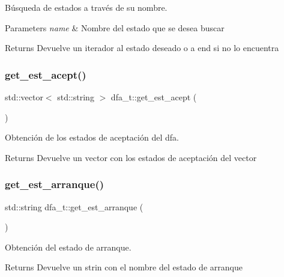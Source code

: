 Búsqueda de estados a través de su nombre. 


\begin{DoxyParams}{Parameters}
{\em name} & Nombre del estado que se desea buscar \\
\hline
\end{DoxyParams}
\begin{DoxyReturn}{Returns}
Devuelve un iterador al estado deseado o a end si no lo encuentra 
\end{DoxyReturn}
\mbox{\label{classdfa__t_a89e3710476f78b84b785787c59cc9850}} 
\subsubsection{\texorpdfstring{get\+\_\+est\+\_\+acept()}{get\_est\_acept()}}
{\footnotesize\ttfamily std\+::vector$<$ std\+::string $>$ dfa\+\_\+t\+::get\+\_\+est\+\_\+acept (\begin{DoxyParamCaption}{ }\end{DoxyParamCaption})}



Obtención de los estados de aceptación del dfa. 

\begin{DoxyReturn}{Returns}
Devuelve un vector con los estados de aceptación del vector 
\end{DoxyReturn}
\mbox{\label{classdfa__t_a922124c387f1be1c8ce0c5395bfce6c7}} 
\subsubsection{\texorpdfstring{get\+\_\+est\+\_\+arranque()}{get\_est\_arranque()}}
{\footnotesize\ttfamily std\+::string dfa\+\_\+t\+::get\+\_\+est\+\_\+arranque (\begin{DoxyParamCaption}{ }\end{DoxyParamCaption})}



Obtención del estado de arranque. 

\begin{DoxyReturn}{Returns}
Devuelve un strin con el nombre del estado de arranque 
\end{DoxyReturn}
\mbox{\label{classdfa__t_aa9042e8cf0e8f63c5ab43e6a507c21fd}} 
